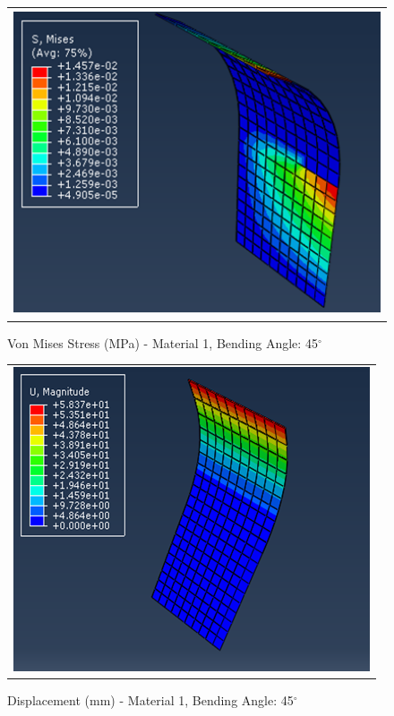 \documentclass[a4paper,12pt]{article}
\numberwithin{equation}{section}
\numberwithin{figure}{section}
\begin{document}
\begin{figure}[H]
  \centering
  \begin{tabular}{@{}c@{}}
    \includegraphics[width=0.7\linewidth,height=255pt]{Results/Bending/M1_VMS_45.png} \\
  \end{tabular}
  \caption{Von Mises Stress (MPa) - Material 1,  Bending Angle: 45$^{\circ}$ }
\end{figure}

\begin{figure}[H]
  \centering
  \begin{tabular}{@{}c@{}}
    \includegraphics[width=0.7\linewidth,height=255pt]{Results/Bending/M1_DIS_45.png} \\
  \end{tabular}
  \caption{Displacement (mm) - Material 1, Bending Angle: 45$^{\circ}$ }
\end{figure}
\end{document}
